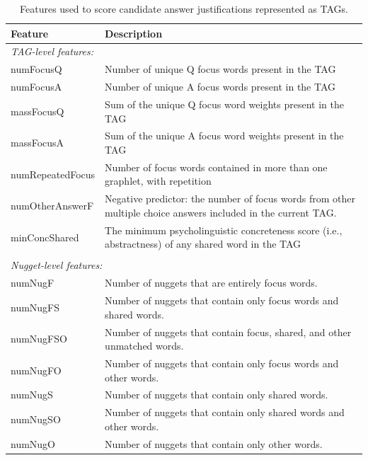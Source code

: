 \begin{table}[]
\caption{{  Features used to score candidate answer justifications represented as TAGs. }} 
\footnotesize{
\begin{tabular}{p{30mm}p{95mm}}
\hline
Feature & Description \\
\hline
\multicolumn{2}{l}{\emph{TAG-level features:}} \\
numFocusQ			&	Number of unique Q focus words present in the TAG						\\
numFocusA			&	Number of unique A focus words present in the TAG						\\
massFocusQ			&	Sum of the unique Q focus word weights present in the TAG				\\
massFocusA			&	Sum of the unique A focus word weights present in the TAG				\\
numRepeatedFocus	&	Number of focus words contained in more than one graphlet, with repetition \\
numOtherAnswerF		&	Negative predictor: the number of focus words from other multiple choice answers included in the current TAG.	\\
minConcShared		&	The minimum psycholinguistic concreteness score (i.e., abstractness) of any shared word in the TAG \\
\\
\multicolumn{2}{l}{\emph{Nugget-level features: }} \\
numNugF				&	Number of nuggets that are entirely focus words. \\
numNugFS 			&	Number of nuggets that contain only focus words and shared words. \\
numNugFSO			&	Number of nuggets that contain focus, shared, and other unmatched words. \\
numNugFO			&	Number of nuggets that contain only focus words and other words. \\
numNugS				&	Number of nuggets that contain only shared words. \\
numNugSO			&	Number of nuggets that contain only shared words and other words. \\
numNugO				&	Number of nuggets that contain only other words. \\

\end{tabular}}
\end{table}
